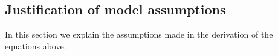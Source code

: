 \subsection{Justification of model assumptions}
In this section we explain the assumptions made in the derivation of the equations above.